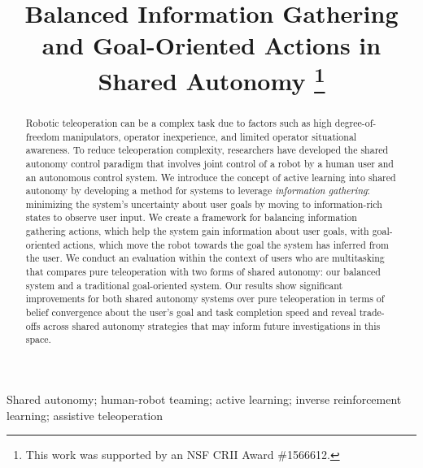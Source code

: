 \documentclass[conference]{IEEEtran}
\begin{document}
\title{Balanced Information Gathering and Goal-Oriented Actions in Shared Autonomy
\thanks{This work was supported by an NSF CRII Award \#1566612.}
}

\author{
\and
{}
}
\maketitle

\begin{abstract}
Robotic teleoperation can be a complex task due to factors such as high degree-of-freedom manipulators, operator inexperience, and limited operator situational awareness. To reduce teleoperation complexity, researchers have developed the shared autonomy control paradigm that involves joint control of a robot by a human user and an autonomous control system. We introduce the concept of active learning into shared autonomy by developing a method for systems to leverage \textit{information gathering}: minimizing the system's uncertainty about user goals by moving to information-rich states to observe user input. We create a framework for balancing information gathering actions, which help the system gain information about user goals, with goal-oriented actions, which move the robot towards the goal the system has inferred from the user. We conduct an evaluation within the context of users who are multitasking that compares pure teleoperation with two forms of shared autonomy: our balanced system and a traditional goal-oriented system. Our results show significant improvements for both shared autonomy systems over pure teleoperation in terms of belief convergence about the user's goal and task completion speed and reveal trade-offs across shared autonomy strategies that may inform future investigations in this space.
\end{abstract}

\begin{IEEEkeywords}
Shared autonomy; human-robot teaming; active learning; inverse reinforcement learning; assistive teleoperation
\end{IEEEkeywords}
\end{document}
